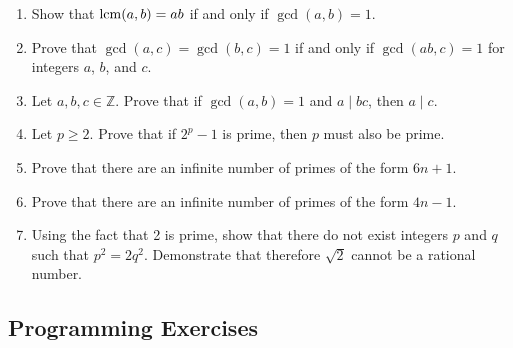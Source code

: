 {\begin{enumerate}
\item
Show that $\operatorname{lcm}(a,b) = ab$ if and only if $\gcd(a,b) = 1$.

\item
Prove that $\gcd(a,c) = \gcd(b,c) =1$ if and only if $\gcd(ab,c) = 1$ for integers $a$, $b$, and $c$.

\item
Let $a, b, c \in {\mathbb Z}$.  Prove that if $\gcd(a,b) = 1$ and $a  \mid bc$, then $a  \mid  c$. 
 
\item
Let $p \geq 2$.  Prove that if $2^p-1$ is prime, then $p$ must also be prime.

\item
Prove that there are an infinite number of primes of the form $6n + 1$. 

\item
Prove that there are an infinite number of primes of the form $4n - 1$.

\item
Using the fact that 2 is prime, show that there do not exist integers $p$ and $q$ such that $p^2 = 2 q^2$.  Demonstrate that therefore $\sqrt{2}$ cannot be a rational number.  

\end{enumerate}
}
 
 
\subsection*{Programming Exercises}
 
